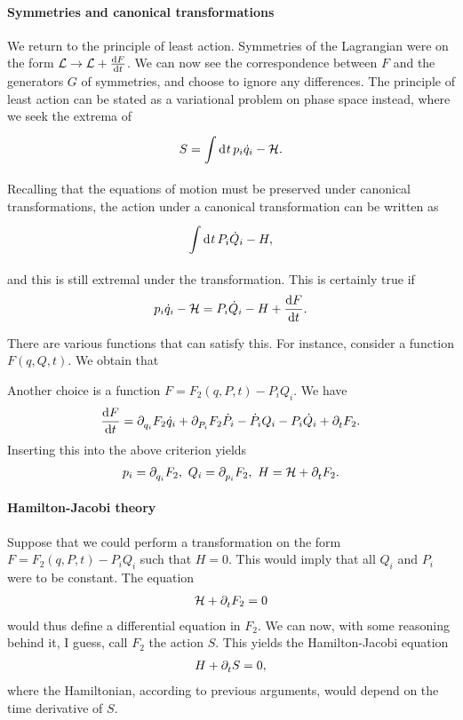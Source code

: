 \paragraph{Symmetries and canonical transformations}
We return to the principle of least action. Symmetries of the Lagrangian were on the form $\mathcal{L}\to\mathcal{L} + \dv{F}{t}$. We can now see the correspondence between $F$ and the generators $G$ of symmetries, and choose to ignore any differences. The principle of least action can be stated as a variational problem on phase space instead, where we seek the extrema of
\begin{align*}
	S = \int\limits_{}^{}\dd[]{t}p_{i}\dot{q}_{i} - \mathcal{H}.
\end{align*}
Recalling that the equations of motion must be preserved under canonical transformations, the action under a canonical transformation can be written as
\begin{align*}
	\int\limits_{}^{}\dd[]{t}P_{i}\dot{Q}_{i} - H,
\end{align*}
and this is still extremal under the transformation. This is certainly true if
\begin{align*}
	p_{i}\dot{q}_{i} - \mathcal{H} = P_{i}\dot{Q}_{i} - H + \dv{F}{t}.
\end{align*}

There are various functions that can satisfy this. For instance, consider a function $F(q, Q, t)$. We obtain that 

Another choice is a function $F = F_{2}(q, P, t) - P_{i}Q_{i}$. We have
\begin{align*}
	\dv{F}{t} = \partial^{}_{q_{i}}F_{2}\dot{q}_{i} + \partial^{}_{P_{i}}F_{2}\dot{P}_{i} - \dot{P}_{i}Q_{i} - P_{i}\dot{Q}_{i} + \partial^{}_{t}F_{2}.
\end{align*}
Inserting this into the above criterion yields
\begin{align*}
	p_{i} = \partial^{}_{q_{i}}F_{2},\ Q_{i} = \partial^{}_{p_{i}}F_{2},\ H = \mathcal{H} + \partial^{}_{t}F_{2}.
\end{align*}

\paragraph{Hamilton-Jacobi theory}
Suppose that we could perform a transformation on the form $F = F_{2}(q, P, t) - P_{i}Q_{i}$ such that $H = 0$. This would imply that all $Q_{i}$ and $P_{i}$ were to be constant. The equation
\begin{align*}
	\mathcal{H} + \partial^{}_{t}F_{2} = 0
\end{align*}
would thus define a differential equation in $F_{2}$. We can now, with some reasoning behind it, I guess, call $F_{2}$ the action $S$. This yields the Hamilton-Jacobi equation
\begin{align*}
	H + \partial^{}_{t}S = 0,
\end{align*}
where the Hamiltonian, according to previous arguments, would depend on the time derivative of $S$.

